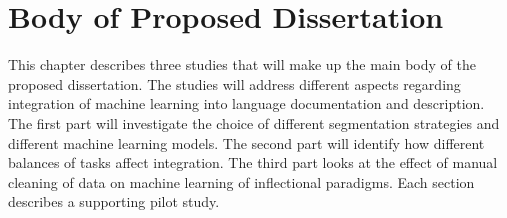\chapter{Body of Proposed Dissertation}
\label{chap:body}

This chapter describes three studies that will make up the main body of the proposed dissertation. The studies will address different aspects regarding integration of machine learning into language documentation and description. The first part will investigate the choice of different segmentation strategies and different machine learning models. The second part will identify how different balances of tasks affect integration. The third part looks at the effect of manual cleaning of data on machine learning of inflectional paradigms. Each section describes a supporting pilot study.



